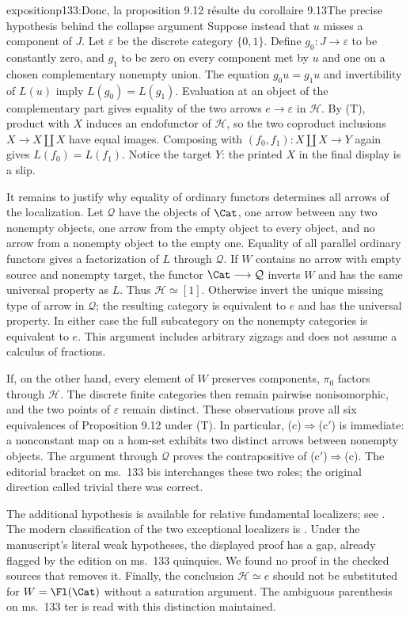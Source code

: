 \begin{dcomment}{exposition}{p133:Donc, la proposition 9.12 résulte du corollaire 9.13}{The precise hypothesis behind the collapse argument}
Suppose instead that $u$ misses a component of $J$. Let $\varepsilon$ be the discrete category $\{0,1\}$. Define $g_0:J\longrightarrow\varepsilon$ to be constantly zero, and $g_1$ to be zero on every component met by $u$ and one on a chosen complementary nonempty union. The equation $g_0u=g_1u$ and invertibility of $L(u)$ imply $L(g_0)=L(g_1)$. Evaluation at an object of the complementary part gives equality of the two arrows $e\longrightarrow\varepsilon$ in $\mathcal H$. By (T), product with $X$ induces an endofunctor of $\mathcal H$, so the two coproduct inclusions $X\longrightarrow X\amalg X$ have equal images. Composing with $(f_0,f_1):X\amalg X\longrightarrow Y$ again gives $L(f_0)=L(f_1)$. Notice the target $Y$: the printed $X$ in the final display is a slip.

It remains to justify why equality of ordinary functors determines all arrows of the localization. Let $\mathcal Q$ have the objects of $\Cat$, one arrow between any two nonempty objects, one arrow from the empty object to every object, and no arrow from a nonempty object to the empty one. Equality of all parallel ordinary functors gives a factorization of $L$ through $\mathcal Q$. If $W$ contains no arrow with empty source and nonempty target, the functor $\Cat\longrightarrow\mathcal Q$ inverts $W$ and has the same universal property as $L$. Thus $\mathcal H\simeq[1]$. Otherwise invert the unique missing type of arrow in $\mathcal Q$; the resulting category is equivalent to $e$ and has the universal property. In either case the full subcategory on the nonempty categories is equivalent to $e$. This argument includes arbitrary zigzags and does not assume a calculus of fractions.

If, on the other hand, every element of $W$ preserves components, $\pi_0$ factors through $\mathcal H$. The discrete finite categories then remain pairwise nonisomorphic, and the two points of $\varepsilon$ remain distinct. These observations prove all six equivalences of Proposition 9.12 under (T). In particular, (c)$\Rightarrow$(c$'$) is immediate: a nonconstant map on a hom-set exhibits two distinct arrows between nonempty objects. The argument through $\mathcal Q$ proves the contrapositive of (c$'$)$\Rightarrow$(c). The editorial bracket on ms.~133 bis interchanges these two roles; the original direction called trivial there was correct.

The additional hypothesis is available for relative fundamental localizers; see \citet[Propositions 2.1.3 and 2.1.9]{Maltsiniotis2020}. The modern classification of the two exceptional localizers is \citet[Proposition 9.3.2]{Cisinski2006}. Under the manuscript's literal weak hypotheses, the displayed proof has a gap, already flagged by the edition on ms.~133 quinquies. We found no proof in the checked sources that removes it. Finally, the conclusion $\mathcal H\simeq e$ should not be substituted for $W=\Fl(\Cat)$ without a saturation argument. The ambiguous parenthesis on ms.~133 ter is read with this distinction maintained.
\end{dcomment}

